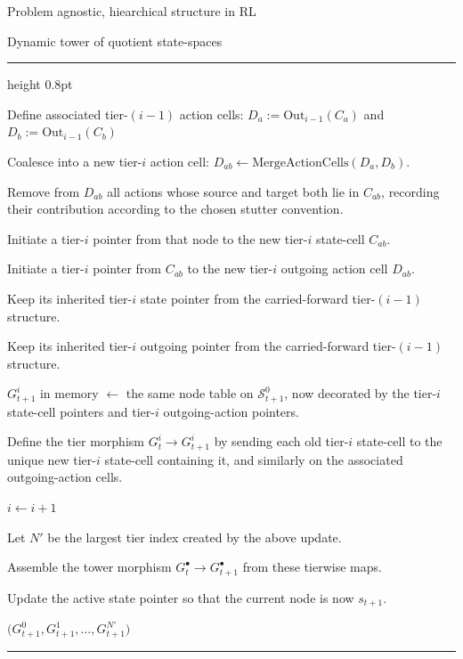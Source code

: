 \documentclass[11pt]{article}
\newenvironment{breakablealgorithm}
    {%
    \begin{center}
    \refstepcounter{algorithm}
    \hrule height 0.8pt\kern 2pt 
    \renewcommand{\caption}[2][\relax]{%
        {\raggedright\textbf{Algorithm \thealgorithm: ##2}\par}
        \ifx\relax##1\relax
            \addcontentsline{loa}{algorithm}{\protect\numberline{\thealgorithm}##2}%
        \else
            \addcontentsline{loa}{algorithm}{\protect\numberline{\thealgorithm}##1}%
            \fi 
        \kern 2pt\hrule\kern 2pt }
    }{%
    \kern 2pt\hrule \end{center} 
    }
\begin{document}
\begin{section}{Problem agnostic, hiearchical structure in RL}
\begin{subsection}{Dynamic tower of quotient state-spaces}
\begin{breakablealgorithm}
\begin{algorithmic}[1]
                \State Define associated tier-$(i-1)$ action cells: $D_a:=\mathrm{Out}_{i-1}(C_a)$ and $D_b:=\mathrm{Out}_{i-1}(C_b)$

                \State Coalesce into a new tier-$i$ action cell:
                $
                D_{ab}\gets \mathrm{MergeActionCells}(D_a,D_b).
                $

                \State Remove from $D_{ab}$ all actions whose source and target both lie in $C_{ab}$, recording their contribution according to the chosen stutter convention.

                    \State Initiate a tier-$i$ pointer from that node to the new tier-$i$ state-cell $C_{ab}$.
                \EndFor

                \State Initiate a tier-$i$ pointer from $C_{ab}$ to the new tier-$i$ outgoing action cell $D_{ab}$.
            \EndIf
        \EndFor

                \State Keep its inherited tier-$i$ state pointer from the carried-forward tier-$(i-1)$ structure.
            \EndIf

                \State Keep its inherited tier-$i$ outgoing pointer from the carried-forward tier-$(i-1)$ structure.
            \EndIf
        \EndFor

        \State $G_{t+1}^i$ in memory $\gets$ the same node table on $\mathcal{S}_{t+1}^0$, now decorated by the tier-$i$ state-cell pointers and tier-$i$ outgoing-action pointers.

        \State Define the tier morphism
        $
        G_t^i \longrightarrow G_{t+1}^i
        $
        by sending each old tier-$i$ state-cell to the unique new tier-$i$ state-cell containing it, and similarly on the associated outgoing-action cells.

        \State $i \gets i+1$

    \EndWhile

    \State Let $N'$ be the largest tier index created by the above update.

    \State Assemble the tower morphism
    $
    G_t^\bullet \longrightarrow G_{t+1}^\bullet
    $
    from these tierwise maps.

    \State Update the active state pointer so that the current node is now $s_{t+1}$.

    \State \Return $\bigl(
    G_{t+1}^0,G_{t+1}^1,\dots,G_{t+1}^{N'}
    \bigr)$
\EndFunction

\end{algorithmic}
\end{breakablealgorithm}

\end{subsection}

\end{section}
\end{document}
